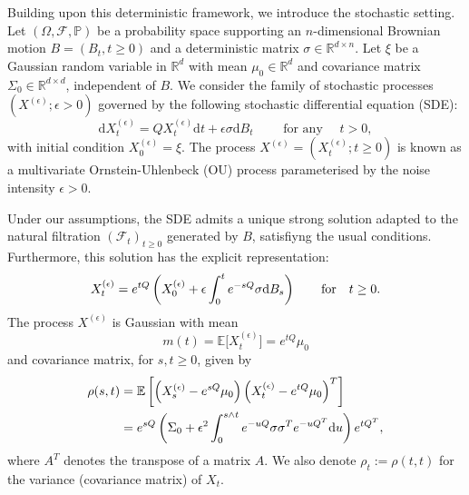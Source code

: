 \documentclass[12pt,thmsa]{article}
\newcommand{\ud}{\mathrm{d}}
\begin{document}
Building upon this deterministic framework, we  introduce the stochastic setting. Let $(\Omega, \mathcal{F}, \mathbb{P})$ be a probability space supporting an $n$-dimensional  Brownian motion $B=(B_t, t\ge 0)$ and a deterministic matrix $\sigma \in \mathbb{R}^{d\times n}$.  Let  $\xi$ be a  Gaussian random variable in $\mathbb{R}^d$ with mean $\mu_0\in \mathbb{R}^{d}$ and covariance matrix $\Sigma_0\in \mathbb{R}^{d\times d}$, independent of $B$. We consider the family of stochastic processes $(X^{(\epsilon)}; \epsilon>0)$ governed by the following stochastic differential equation (SDE):
\begin{equation}\label{SDE}
\ud X^{(\epsilon)}_t =QX^{(\epsilon)}_t \ud t +\epsilon \sigma \ud B_t\qquad \textrm{ for any }\quad t>0,
\end{equation}
with initial condition $X_0^{(\epsilon)}=\xi$. The  process $X^{(\epsilon)}=(X^{(\epsilon)}_t; t\ge 0)$ is known as a multivariate Ornstein-Uhlenbeck (OU) process parameterised by the noise intensity $\epsilon>0$.

Under our assumptions, the SDE admits a unique strong solution adapted to the natural filtration $(\mathcal{F}_t)_{t\ge 0}$ generated by $B$, satisfiyng  the usual conditions.  Furthermore, this solution  has the explicit representation:
\begin{equation}\label{specific}
X_{t}^{(\epsilon)}=e^{tQ}\left(X_0^{(\epsilon)} +\epsilon\int_0^t e^{-sQ}\sigma {\rm d} B_s\right) \qquad \textrm{for}\quad t\ge 0.
\end{equation}
The  process $X^{(\epsilon)}$ is  Gaussian  with mean
\[
m(t)=\mathbb{E}\Big[X_{t}^{(\epsilon)}\Big]=e^{tQ}\mu_0
\]
and covariance matrix, for $s, t\ge 0$, given by
\begin{equation}\label{covmatrix}
\begin{split}
	\rho(s,t)&=\mathbb{E}\left[\left(X^{(\epsilon)}_s-e^{sQ}\mu_0\right)\left(X_t^{(\epsilon)}-e^{tQ}\mu_0\right)^T\right]\\
	&=e^{sQ}\left(\Sigma_0+\epsilon^2\int_0^{s\land t}e^{-uQ}\sigma\sigma^T e^{-uQ^T}{\rm d}u\right)e^{tQ^T},
\end{split}
\end{equation}
where  $A^T$ denotes the transpose of a matrix $A$. We also denote $\rho_t:=\rho(t,t)$ for the variance (covariance matrix) of $X_t$.
\end{document}
